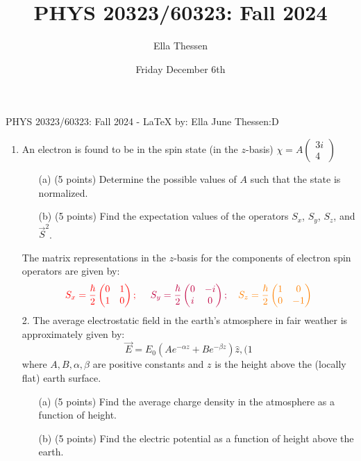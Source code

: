 \documentclass[11.5pt]{article}
\begin{document}
\def\pos{\medskip\quad}
\def\subpos{\smallskip \qquad}

\title{PHYS 20323/60323: Fall 2024}
\author{Ella Thessen}
\date{Friday December 6th}

\begin{center}
    {\Large
    PHYS 20323/60323: Fall 2024 - LaTeX by: Ella June Thessen:D}\vspace{.25cm}

\begin{enumerate}
    \item 
\text An electron is found to be in the spin state (in the $z$-basis) $\chi = A
\begin{pmatrix}
3i \\
4
\end{pmatrix}
$
\begin{enumerate}
    \item[(a)] (5 points) Determine the possible values of \( A \) such that the state is normalized.\vspace{1cm}
   \item[(b)] (5 points) Find the expectation values of the operators \color{red}\( S_x \),\color{purple} \( S_y \), \color{black}\( S_z \), and \( \vec{S}^2 \).\vspace{1cm}
\end{enumerate}
The matrix representations in the \( z \)-basis for the components of electron spin operators are given by:
\[\color{red}S_x = \frac{\hbar}{2} 
\begin{pmatrix}
0 & 1 \\ 
1 & 0
\end{pmatrix};\ \quad
\color{purple}S_y = \frac{\hbar}{2} 
\begin{pmatrix}
0 & -i \\ 
i & 0
\end{pmatrix}; \quad
\color{orange}S_z = \frac{\hbar}{2} 
\begin{pmatrix}
1 & 0 \\ 
0 & -1
\end{pmatrix}\vspace{0.25cm}
\] 
\textbf{}{2. The average electrostatic field in the earth’s atmosphere in fair weather is approximately given by:} 
\[
\vec{E} = E_0 
\left(
A e^{-\alpha z} + B e^{-\beta z}
\right)
\hat{z},
                                                                               (1\]
where \( A, B, \alpha, \beta \) are positive constants and \( z \) is the height above the (locally flat) earth surface.\vspace{.10cm}
\begin{enumerate}
    \item[(a)] (5 points) Find the average charge density in the atmosphere as a function of height.\vspace{0.25cm}
    \item[(b)] (5 points) Find the electric potential as a function of height above the earth.\vspace{0.25cm}  
\end{enumerate}


\end{enumerate}
\end{center}
\end{document}
